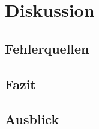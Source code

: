 \chapter{Diskussion}
\label{ch:discussion}

\blindtext

\section{Fehlerquellen}
\label{sec:discussion:error_sources}

\blindtext

\section{Fazit}
\label{sec:discussion:conclusion}

\blindtext

\section{Ausblick}
\label{sec:discussion:outlook}

\blindtext